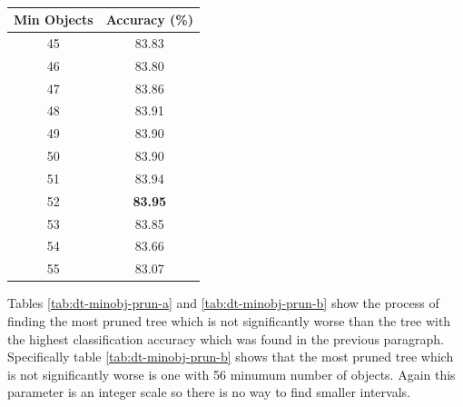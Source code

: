\documentclass[12pt]{article}
\begin{document}
\begin{table}[H]
\begin{subtable}{.5\linewidth}
          \caption{}
          \begin{tabular}{c|c}
            \toprule
            \multicolumn{1}{l|}{Min Objects} & \multicolumn{1}{l}{Accuracy (\%)} \\
            \midrule
            45    & 83.83 \\
            46    & 83.80 \\
            47    & 83.86 \\
            48    & 83.91 \\
            49    & 83.90 \\
            50    & 83.90 \\
            51    & 83.94 \\
            52    & \textbf{83.95} \\
            53    & 83.85 \\
            54    & 83.66 \\
            55    & 83.07 \\
            \bottomrule
            \end{tabular}
          \label{tab:dt-minobj-b}
        \end{subtable}
        \label{tab:dt-minobj}
      \end{table}

      Tables \ref{tab:dt-minobj-prun-a} and \ref{tab:dt-minobj-prun-b} show the process of finding the most pruned tree which is not significantly worse than the tree with the highest classification accuracy which was found in the previous paragraph. Specifically table \ref{tab:dt-minobj-prun-b} shows that the most pruned tree which is not significantly worse is one with 56 minumum number of objects. Again this parameter is an integer scale so there is no way to find smaller intervals.
\end{document}
